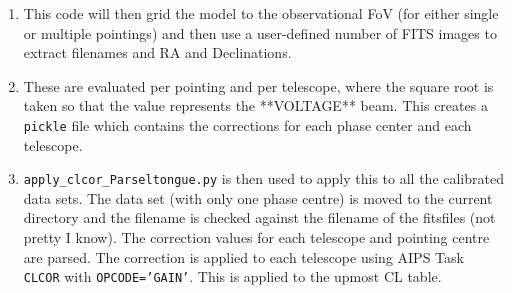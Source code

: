 \documentclass[idxtotoc,hyperref,openany]{article} %
\begin{document}
\begin{enumerate}[topsep=0pt,itemsep=-1ex,partopsep=1ex,parsep=1ex]
	\item This code will then grid the model to the observational FoV (for either single or multiple pointings) and then use a user-defined number of FITS images to extract filenames and RA and Declinations. 
	
	\item These are evaluated per pointing and per telescope, where the square root is taken so that the value represents the **VOLTAGE** beam. This creates a \texttt{pickle} file which contains the corrections for each phase center and each telescope.
	
	\item \texttt{apply\_clcor\_Parseltongue.py} is then used to apply this to all the calibrated data sets. The data set (with only one phase centre) is moved to the current directory and the filename is checked against the filename of the fitsfiles (not pretty I know). The correction values for each telescope and pointing centre are parsed. The correction is applied to each telescope using AIPS Task \texttt{CLCOR} with \texttt{OPCODE='GAIN'}. This is applied to the upmost CL table. 
\end{enumerate}
\end{document}

